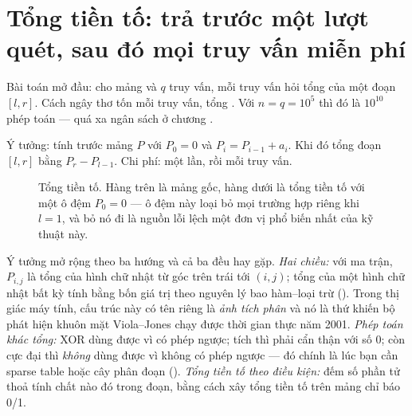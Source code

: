 \documentclass[../../algorithm.tex]{subfiles}
\begin{document}
\section{Tổng tiền tố: trả trước một lượt quét, sau đó mọi truy vấn miễn phí}

Bài toán mở đầu: cho mảng và \(q\) truy vấn, mỗi truy vấn hỏi tổng của một đoạn \([l,r]\). Cách ngây thơ tốn  mỗi truy vấn, tổng . Với \(n = q = 10^5\) thì đó là \(10^{10}\) phép toán --- quá xa ngân sách ở chương .

Ý tưởng: tính trước mảng \(P\) với \(P_0 = 0\) và \(P_i = P_{i-1} + a_i\). Khi đó tổng đoạn \([l,r]\) bằng \(P_r - P_{l-1}\). Chi phí:  một lần, rồi  mỗi truy vấn.

\begin{figure}[H]\centering
{}
\caption{Tổng tiền tố. Hàng trên là mảng gốc, hàng dưới là tổng tiền tố với một ô đệm \(P_0=0\) --- ô đệm này loại bỏ mọi trường hợp riêng khi \(l=1\), và bỏ nó đi là nguồn lỗi lệch một đơn vị phổ biến nhất của kỹ thuật này.}
\label{fig:prefix}
\end{figure}

Ý tưởng mở rộng theo ba hướng và cả ba đều hay gặp. \emph{Hai chiều:} với ma trận, \(P_{i,j}\) là tổng của hình chữ nhật từ góc trên trái tới \((i,j)\); tổng của một hình chữ nhật bất kỳ tính bằng bốn giá trị theo nguyên lý bao hàm--loại trừ (). Trong thị giác máy tính, cấu trúc này có tên riêng là \emph{ảnh tích phân} và nó là thứ khiến bộ phát hiện khuôn mặt Viola--Jones chạy được thời gian thực năm 2001. \emph{Phép toán khác tổng:} XOR dùng được vì có phép ngược; tích thì phải cẩn thận với số 0; còn cực đại thì \emph{không} dùng được vì không có phép ngược --- đó chính là lúc bạn cần sparse table hoặc cây phân đoạn (). \emph{Tổng tiền tố theo điều kiện:} đếm số phần tử thoả tính chất nào đó trong đoạn, bằng cách xây tổng tiền tố trên mảng chỉ báo 0/1.
\end{document}
